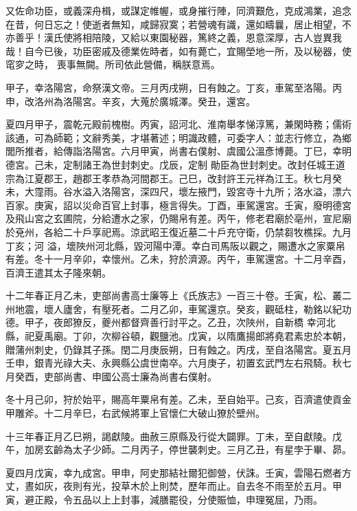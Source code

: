 \begin{pinyinscope}
 又佐命功臣，或義深舟楫，或謀定帷幄，或身摧行陣，同濟艱危，克成鴻業，追念在昔，何日忘之！使逝者無知，咸歸寂寞；若營魂有識，還如疇曩，居止相望，不亦善乎！漢氏使將相陪陵，又給以東園秘器，篤終之義，恩意深厚，古人豈異我哉！自今已後，功臣密戚及德業佐時者，如有薨亡，宜賜塋地一所，及以秘器，使窀穸之時，
 喪事無闕。所司依此營備，稱朕意焉。



 甲子，幸洛陽宮，命祭漢文帝。三月丙戌朔，日有蝕之。丁亥，車駕至洛陽。丙申，改洛州為洛陽宮。辛亥，大蒐於廣城澤。癸丑，還宮。



 夏四月甲子，震乾元殿前槐樹。丙寅，詔河北、淮南舉孝悌淳篤，兼閑時務；儒術該通，可為師範；文辭秀美，才堪著述；明識政體，可委字人：並志行修立，為鄉閭所推者，給傳詣洛陽宮。六月甲寅，尚書右僕射、虞國公溫彥博薨。丁巳，幸明德宮。己未，定制諸王為世封刺史。戊辰，定制
 勛臣為世封刺史。改封任城王道宗為江夏郡王，趙郡王孝恭為河間郡王。己巳，改封許王元祥為江王。秋七月癸未，大霪雨。谷水溢入洛陽宮，深四尺，壞左掖門，毀宮寺十九所；洛水溢，漂六百家。庚寅，詔以災命百官上封事，極言得失。丁酉，車駕還宮。壬寅，廢明德宮及飛山宮之玄圃院，分給遭水之家，仍賜帛有差。丙午，修老君廟於亳州，宣尼廟於兗州，各給二十戶享祀焉。涼武昭王復近墓二十戶充守衛，仍禁芻牧樵採。九月丁亥；河
 溢，壞陜州河北縣，毀河陽中潭。幸白司馬阪以觀之，賜遭水之家粟帛有差。冬十一月辛卯，幸懷州。乙未，狩於濟源。丙午，車駕還宮。十二月辛酉，百濟王遣其太子隆來朝。



 十二年春正月乙未，吏部尚書高士廉等上《氏族志》一百三十卷。壬寅，松、叢二州地震，壞人廬舍，有壓死者。二月乙卯，車駕還京。癸亥，觀砥柱，勒銘以紀功德。甲子，夜郎獠反，夔州都督齊善行討平之。乙丑，次陜州，自新橋
 幸河北縣，祀夏禹廟。丁卯，次柳谷頓，觀鹽池。戊寅，以隋鷹揚郎將堯君素忠於本朝，贈蒲州刺史，仍錄其子孫。閏二月庚辰朔，日有蝕之。丙戌，至自洛陽宮。夏五月壬申，銀青光祿大夫、永興縣公虞世南卒。六月庚子，初置玄武門左右飛騎。秋七月癸酉，吏部尚書、申國公高士廉為尚書右僕射。



 冬十月己卯，狩於始平，賜高年粟帛有差。乙未，至自始平。己亥，百濟遣使貢金甲雕斧。十二月辛巳，右武候將軍上官懷仁大破山獠於壁州。



 十三年春正月乙巳朔，謁獻陵。曲赦三原縣及行從大闢罪。丁未，至自獻陵。戊午，加房玄齡為太子少師。二月丙子，停世襲刺史。三月乙丑，有星孛于畢、昴。



 夏四月戊寅，幸九成宮。甲申，阿史那結社爾犯御營，伏誅。壬寅，雲陽石燃者方丈，晝如灰，夜則有光，投草木於上則焚，歷年而止。自去冬不雨至於五月。甲寅，避正殿，令五品以上上封事，減膳罷役，分使賑恤，申理冤屈，乃雨。




\end{pinyinscope}

